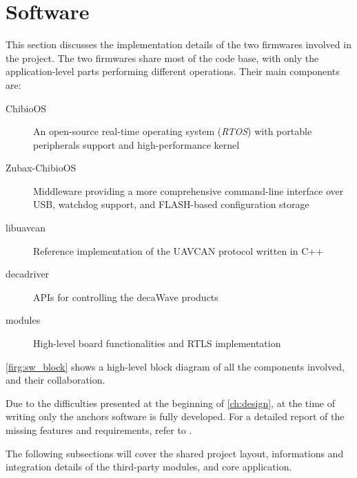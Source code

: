 \section{Software}\label{sec:software}

This section discusses the implementation details of the two firmwares involved in the project.
The two firmwares share most of the code base, with only the application-level parts performing different operations.
Their main components are:
\begin{description}
    \item[ChibioOS] An open-source real-time operating system (\emph{RTOS}) with portable peripherals support and high-performance kernel
    \item[Zubax-ChibioOS] Middleware providing a more comprehensive command-line interface over USB, watchdog support, and FLASH-based configuration storage
    \item[libuavcan] Reference implementation of the UAVCAN protocol written in C++
    \item[decadriver] APIs for controlling the decaWave products
    \item[modules] High-level board functionalities and RTLS implementation
\end{description}

\autoref{firg:sw_block} shows a high-level block diagram of all the components involved, and their collaboration.


Due to the difficulties presented at the beginning of \autoref{ch:design}, at the time of writing only the anchors software is fully developed.
For a detailed report of the missing features and requirements, refer to .

The following subsections will cover the shared project layout, informations and integration details of the third-party modules, and core application.









